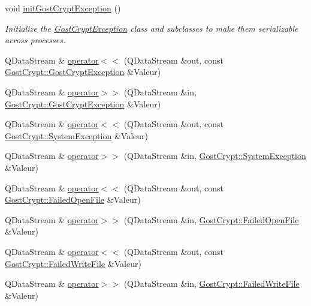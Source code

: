 \begin{DoxyCompactItemize}
\item 
void \hyperlink{namespace_gost_crypt_ab650c0c6902fcf859bb05a79fe90b89e}{init\+Gost\+Crypt\+Exception} ()
\begin{DoxyCompactList}\small\item\em Initialize the \hyperlink{class_gost_crypt_1_1_gost_crypt_exception}{Gost\+Crypt\+Exception} class and subclasses to make them serializable across processes. \end{DoxyCompactList}\item 
Q\+Data\+Stream \& \hyperlink{namespace_gost_crypt_a047bc2c476276b6fda87390679fe51d8}{operator$<$$<$} (Q\+Data\+Stream \&out, const \hyperlink{class_gost_crypt_1_1_gost_crypt_exception}{Gost\+Crypt\+::\+Gost\+Crypt\+Exception} \&Valeur)
\item 
Q\+Data\+Stream \& \hyperlink{namespace_gost_crypt_ab6b04c752149af5db0d728d0c6582f58}{operator$>$$>$} (Q\+Data\+Stream \&in, \hyperlink{class_gost_crypt_1_1_gost_crypt_exception}{Gost\+Crypt\+::\+Gost\+Crypt\+Exception} \&Valeur)
\item 
Q\+Data\+Stream \& \hyperlink{namespace_gost_crypt_a9fc12a1e84452ffc1afabd85386fae1f}{operator$<$$<$} (Q\+Data\+Stream \&out, const \hyperlink{class_gost_crypt_1_1_system_exception}{Gost\+Crypt\+::\+System\+Exception} \&Valeur)
\item 
Q\+Data\+Stream \& \hyperlink{namespace_gost_crypt_a7d483519a72417af318b33cdcd0b2ac0}{operator$>$$>$} (Q\+Data\+Stream \&in, \hyperlink{class_gost_crypt_1_1_system_exception}{Gost\+Crypt\+::\+System\+Exception} \&Valeur)
\item 
Q\+Data\+Stream \& \hyperlink{namespace_gost_crypt_a7f9cbebff0031b2118e621e71c775a2b}{operator$<$$<$} (Q\+Data\+Stream \&out, const \hyperlink{class_gost_crypt_1_1_failed_open_file}{Gost\+Crypt\+::\+Failed\+Open\+File} \&Valeur)
\item 
Q\+Data\+Stream \& \hyperlink{namespace_gost_crypt_a76f61997a08a429222c520f5eefd2623}{operator$>$$>$} (Q\+Data\+Stream \&in, \hyperlink{class_gost_crypt_1_1_failed_open_file}{Gost\+Crypt\+::\+Failed\+Open\+File} \&Valeur)
\item 
Q\+Data\+Stream \& \hyperlink{namespace_gost_crypt_a8961bd330175b243df8f40b99a6b0964}{operator$<$$<$} (Q\+Data\+Stream \&out, const \hyperlink{class_gost_crypt_1_1_failed_write_file}{Gost\+Crypt\+::\+Failed\+Write\+File} \&Valeur)
\item 
Q\+Data\+Stream \& \hyperlink{namespace_gost_crypt_ac5980fee2234e40fa268491b18e9e155}{operator$>$$>$} (Q\+Data\+Stream \&in, \hyperlink{class_gost_crypt_1_1_failed_write_file}{Gost\+Crypt\+::\+Failed\+Write\+File} \&Valeur)

\end{DoxyCompactItemize}
